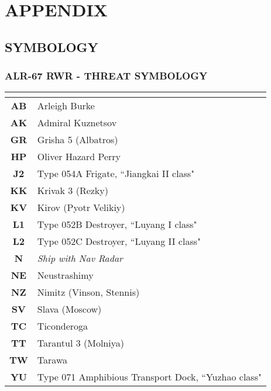 \documentclass[fontMetropolis]{TechCheck}
\begin{document}
	\chapter{APPENDIX}
	\minitoc
	\cleardoublepage

	\section{SYMBOLOGY}

	\subsection{ALR-67 RWR - THREAT SYMBOLOGY}
	\label{subsec:rwrsymb}
	\begin{multicols*}{2}
	\begin{center}
		\begin{tabular}{c | p{4cm} }
			\toprule
			\multicolumn{2}{c}{\blue{SHIPS}} \\
			\toprule
			\textbf{AB} & Arleigh Burke \\
			\midrule
			\textbf{AK} & Admiral Kuznetsov \\
			\midrule
			\textbf{GR} & Grisha 5 (Albatros) \\
			\midrule
			\textbf{HP} & Oliver Hazard Perry \\
			\midrule
			\textbf{J2} & Type 054A Frigate, ``Jiangkai II class" \\
			\midrule
			\textbf{KK} & Krivak 3 (Rezky) \\
			\midrule
			\textbf{KV} & Kirov (Pyotr Velikiy) \\
			\midrule
			\textbf{L1} & Type 052B Destroyer, ``Luyang I class" \\
			\midrule
			\textbf{L2} & Type 052C Destroyer, ``Luyang II class" \\
			\midrule
			\textbf{N} & \emph{Ship with Nav Radar} \\
			\midrule
			\textbf{NE} & Neustrashimy \\
			\midrule
			\textbf{NZ} & Nimitz (Vinson, Stennis) \\
			\midrule
			\textbf{SV} & Slava (Moscow) \\
			\midrule
			\textbf{TC} & Ticonderoga \\
			\midrule
			\textbf{TT} & Tarantul 3 (Molniya) \\
			\midrule
			\textbf{TW} & Tarawa \\
			\midrule
			\textbf{YU} & Type 071 Amphibious Transport Dock, ``Yuzhao class" \\

\end{tabular}
\end{center}
\end{multicols*}
\end{document}
